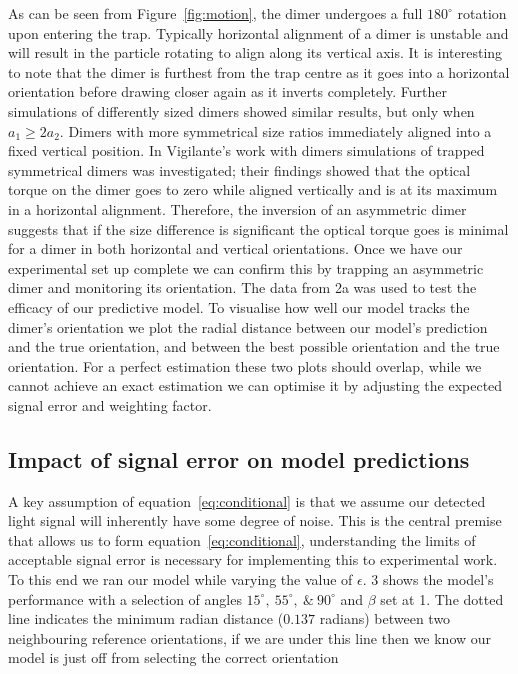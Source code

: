 \documentclass[final, 3p]{elsarticle}
\begin{document}
As can be seen from Figure~\ref{fig:motion}, the dimer undergoes a full $180^{\circ}$ rotation upon entering the trap. Typically horizontal alignment of a dimer is unstable and will result in the particle rotating to align along its vertical axis. It is interesting to note that the dimer is furthest from the trap centre as it goes into a horizontal orientation before drawing closer again as it inverts completely. Further simulations of differently sized dimers showed similar results, but only when $a_1 \geq 2a_2$. Dimers with more symmetrical size ratios immediately aligned into a fixed vertical position. 
In Vigilante's work with dimers \cite{Vigilante2020Brownian_OT} simulations of trapped symmetrical dimers was investigated; their findings showed that the optical torque on the dimer goes to zero while aligned vertically and is at its maximum in a horizontal alignment. Therefore, the inversion of an asymmetric dimer suggests that if the size difference is significant the optical torque goes is minimal for a dimer in both horizontal and vertical orientations. Once we have our experimental set up complete we can confirm this by trapping an asymmetric dimer and monitoring its orientation. The data from \figurename{ 2a} was used to test the efficacy of our predictive model. To visualise how well our model tracks the dimer's orientation we plot the radial distance between our model's prediction and the true orientation, and between the best possible orientation and the true orientation. For a perfect estimation these two plots should overlap, while we cannot achieve an exact estimation we can optimise it by adjusting the expected signal error and weighting factor. 

\subsection{Impact of signal error on model predictions}
\label{sec:3.2}
A key assumption of equation~\ref{eq:conditional} is that we assume our detected light signal will inherently have some degree of noise. This is the central premise that allows us to form equation~\eqref{eq:conditional}, understanding the limits of acceptable signal error is necessary for implementing this to experimental work.
To this end we ran our model while varying the value of $\epsilon$. \figurename{ 3} shows the model's performance with a selection of angles $15^{\circ},\ 55^{\circ}, \ \& \ 90^{\circ}$ and $\beta$ set at 1. The dotted line indicates the minimum radian distance ($0.137$ radians) between two neighbouring reference orientations, if we are under this line then we know our model is just off from selecting the correct orientation
\end{document}

